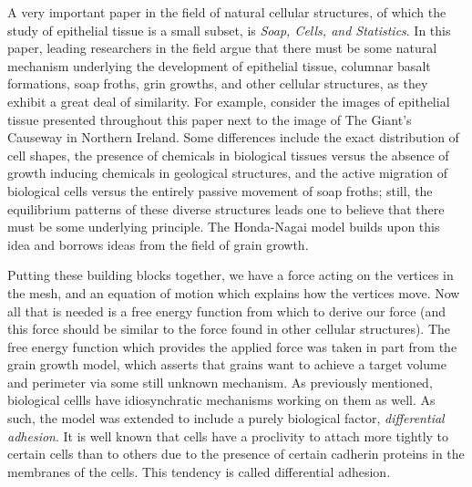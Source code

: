 A very important paper in the field of natural cellular structures, of which the study of epithelial tissue is a small subset, is \emph{Soap, Cells, and Statistics}. In this paper, leading researchers in the field  argue that there must be some natural mechanism underlying the development of epithelial tissue, columnar basalt formations, soap froths, grin growths, and other cellular structures, as they exhibit a great deal of similarity. For example, consider the images of epithelial tissue presented throughout this paper next to the image of The Giant's Causeway in Northern Ireland. Some differences include the exact distribution of cell shapes, the presence of chemicals in biological tissues versus the absence of growth inducing chemicals in geological structures, and the active migration of biological cells versus the entirely passive movement of soap froths; still, the equilibrium patterns of these diverse structures leads one to believe that there must be some underlying principle. The Honda-Nagai model builds upon this idea and borrows ideas from the field of grain growth.

Putting these building blocks together, we have a force acting on the vertices in the mesh, and an equation of motion which explains how the vertices move. Now all that is needed is a free energy function from which to derive our force (and this force should be similar to the force found in other cellular structures). The free energy function which provides the applied force was taken in part from the grain growth model, which asserts that grains want to achieve a target volume and perimeter via some still unknown mechanism. As previously mentioned, biological cellls have idiosynchratic mechanisms working on them as well. As such, the model was extended to include a purely biological factor, \emph{differential adhesion}. It is well known that cells have a proclivity to attach more tightly to certain cells  than to others due to the presence of certain cadherin proteins in the membranes of the cells. This tendency is called differential adhesion.

